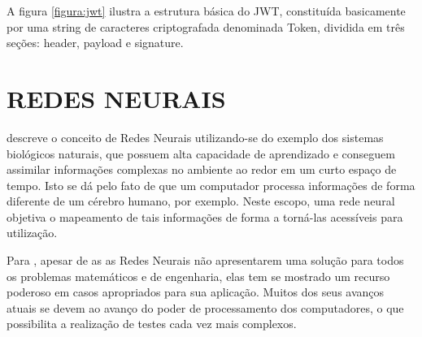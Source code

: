 A figura \ref{figura:jwt} ilustra a estrutura básica do JWT, constituída basicamente por uma string de caracteres criptografada denominada Token, dividida em três seções: header, payload e signature.

\section{REDES NEURAIS}

 descreve o conceito de Redes Neurais utilizando-se do exemplo dos sistemas biológicos naturais, que possuem alta capacidade de aprendizado e conseguem assimilar informações complexas no ambiente ao redor em um curto espaço de tempo. Isto se dá pelo fato de que um computador processa informações de forma diferente de um cérebro humano, por exemplo. Neste escopo, uma rede neural objetiva o mapeamento de tais informações de forma a torná-las acessíveis para utilização.

Para , apesar de as as Redes Neurais não apresentarem uma solução para todos os problemas matemáticos e de engenharia, elas tem se mostrado um recurso poderoso em casos apropriados para sua aplicação. Muitos dos seus avanços atuais se devem ao avanço do poder de processamento dos computadores, o que possibilita a realização de testes cada vez mais complexos.

